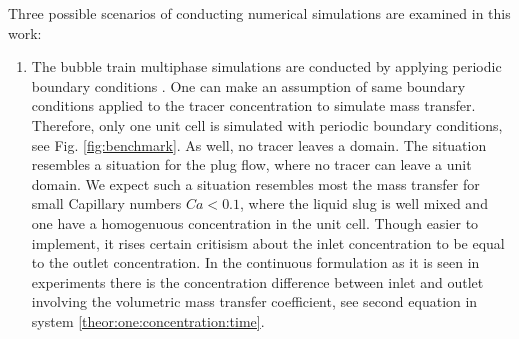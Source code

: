 \documentclass{article}
\begin{document}
Three possible scenarios of conducting numerical simulations are examined in this work: 
\begin{enumerate}
\item The bubble train multiphase simulations are conducted by applying periodic boundary
conditions \cite{kuzmin-binary2d,kuzmin-binary3d}. One
can make an assumption of same boundary
conditions applied to the tracer concentration to simulate mass transfer. Therefore, only one unit
cell is simulated with
periodic boundary conditions, see Fig. \ref{fig:benchmark}. As well, no tracer leaves a
domain. The situation resembles a situation for the plug flow, where no tracer can leave a unit
domain. We expect such a situation resembles most the mass transfer for small Capillary numbers
$Ca<0.1$, where the liquid slug is well mixed and one have a homogenuous concentration in the unit
cell. Though easier to implement, it rises certain critisism
about the inlet concentration to be equal to the outlet concentration. In the continuous
formulation as it is seen in experiments there is the concentration difference between inlet and
outlet involving the volumetric
mass transfer coefficient, see second equation in system \ref{theor:one:concentration:time}.


\end{enumerate}
\end{document}

